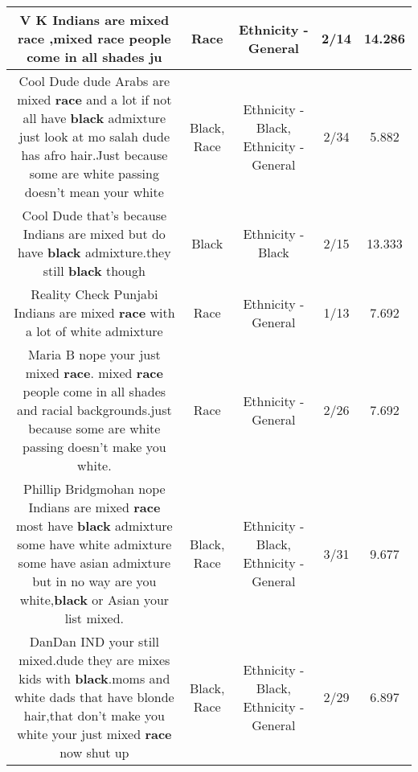 \documentclass[11pt]{article}
\newlength\mylength
\begin{document}
\begin{center}
\begin{longtable}{|C{.65\mylength}|C{.30\mylength}|C{.12\mylength}|C{.12\mylength}|C{.12\mylength}|}
  \small V K Indians are mixed \textbf{race} ,mixed \textbf{race} people come in all shades ju\normalsize   & Race & Ethnicity - General & 2/14 & 14.286 \\  \hline
  \small Cool Dude dude Arabs are mixed \textbf{race} and a lot if not all have \textbf{black} admixture just look at mo salah dude has afro hair.Just because some are white passing doesn't mean your white\normalsize   & Black, Race & Ethnicity - Black, Ethnicity - General & 2/34 & 5.882 \\  \hline
  \small Cool Dude that's because Indians are mixed but do have \textbf{black} admixture.they still \textbf{black} though\normalsize   & Black & Ethnicity - Black & 2/15 & 13.333 \\  \hline
  \small Reality Check Punjabi Indians are mixed \textbf{race} with a lot of white admixture\normalsize   & Race & Ethnicity - General & 1/13 & 7.692 \\  \hline
  \small Maria B nope your just mixed \textbf{race}. mixed \textbf{race} people come in all shades and racial backgrounds.just because some are white passing doesn't make you white.\normalsize   & Race & Ethnicity - General & 2/26 & 7.692 \\  \hline
  \small Phillip Bridgmohan nope Indians are mixed \textbf{race} most have \textbf{black} admixture some have white admixture some have asian admixture but in no way are you white,\textbf{black} or Asian your list mixed.\normalsize   & Black, Race & Ethnicity - Black, Ethnicity - General & 3/31 & 9.677 \\  \hline
  \small DanDan IND your still mixed.dude they are mixes kids with \textbf{black}.moms  and white dads that have blonde hair,that don't make you white your just mixed \textbf{race} now shut up\normalsize   & Black, Race & Ethnicity - Black, Ethnicity - General & 2/29 & 6.897 \\  \hline

\end{longtable}
\end{center}
\end{document}

